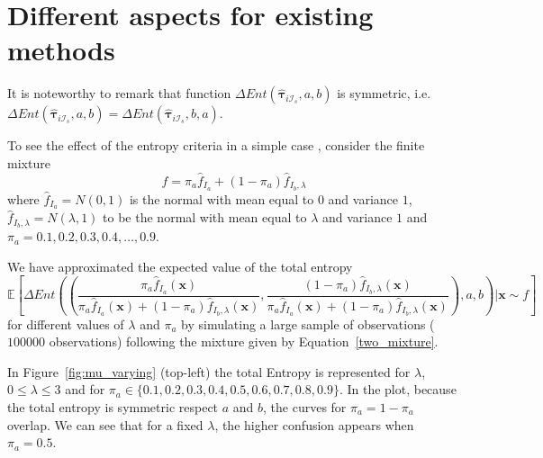 \documentclass[10pt, a4paper]{article}
\newcommand{\m}[1]{\boldsymbol{#1}}
\begin{document}












\section{Different aspects for existing methods}

It is noteworthy to remark that function $\Delta Ent(\hat{\m \tau}_{i \mathcal{I}_s}, a, b)$ is symmetric, i.e. $\Delta Ent(\hat{\m \tau}_{i \mathcal{I}_s}, a, b) = \Delta Ent(\hat{\m \tau}_{i \mathcal{I}_s}, b, a)$.

To see the effect of the entropy criteria in a simple case , consider the finite mixture
\begin{equation}\label{two_mixture}
f = \pi_a \hat{f}_{I_a} + (1 - \pi_a) \hat{f}_{I_b, \lambda}
\end{equation}
where $\hat{f}_{I_a} = N(0, 1)$ is the normal with mean equal to $0$ and variance $1$, $\hat{f}_{I_b, \lambda} = N(\lambda, 1)$ to be the normal with mean equal to $\lambda$ and variance $1$ and $\pi_a = 0.1, 0.2, 0.3, 0.4, \dots, 0.9$. 

We have approximated the expected value of the total entropy
\[
\mathbb{E}\left[ \Delta Ent\left(
 \left( 
 \frac{\pi_a \hat{f}_{I_a}(\m x)}{\pi_a \hat{f}_{I_a}(\m x) + (1-\pi_a) \hat{f}_{I_b, \lambda}(\m x)}, 
 \frac{(1-\pi_a) \hat{f}_{I_b, \lambda}(\m x)}{\pi_a \hat{f}_{I_a}(\m x) + (1-\pi_a) \hat{f}_{I_b, \lambda}(\m x)} \right), a, b\right) | \m x \sim f \right]
\]
for different values of $\lambda$ and $\pi_a$ by simulating a large sample of observations ($100000$ observations)  following the mixture given by Equation~\ref{two_mixture}.

In Figure~\ref{fig:mu_varying} (top-left) the total Entropy is represented for $\lambda$, $0 \leq \lambda \leq 3$ and for $\pi_a \in \{ 0.1, 0.2, 0.3, 0.4, 0.5, 0.6, 0.7, 0.8, 0.9\}$. In the plot, because the total entropy is symmetric respect $a$ and $b$, the curves for $\pi_a = 1-\pi_a$ overlap. We can see that for a fixed $\lambda$, the higher confusion appears when $\pi_a = 0.5$.
\end{document}
